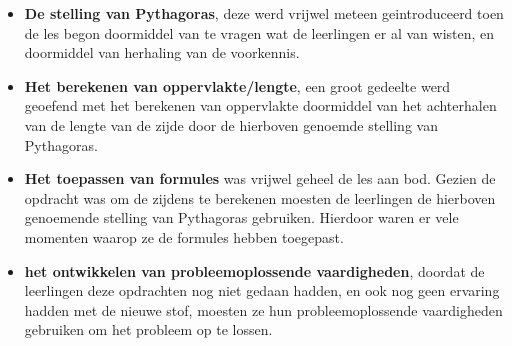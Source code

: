 \documentclass{article}
\begin{document}
\begin{enumerate}[label=(\alph*)]
\begin{itemize}
                        \item \textbf{De stelling van Pythagoras}, deze werd vrijwel meteen geintroduceerd toen de les begon doormiddel van te vragen wat de leerlingen er al van wisten, en doormiddel van herhaling van de voorkennis.
                        \item \textbf{Het berekenen van oppervlakte/lengte}, een groot gedeelte werd geoefend met het berekenen van oppervlakte doormiddel van het achterhalen van de lengte van de zijde door de hierboven genoemde stelling van Pythagoras.
                        \item \textbf{Het toepassen van formules} was vrijwel geheel de les aan bod. Gezien de opdracht was om de zijdens te berekenen moesten de leerlingen de hierboven genoemende stelling van Pythagoras gebruiken. Hierdoor waren er vele momenten waarop ze de formules hebben toegepast.
                        \item \textbf{het ontwikkelen van probleemoplossende vaardigheden}, doordat de leerlingen deze opdrachten nog niet gedaan hadden, en ook nog geen ervaring hadden met de nieuwe stof, moesten ze hun probleemoplossende vaardigheden gebruiken om het probleem op te lossen.
                    \end{itemize}
            \end{enumerate}
        \newpage
    
\end{document}
